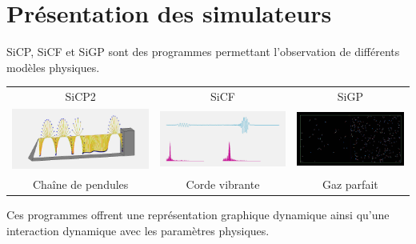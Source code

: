 %
\section{Présentation des simulateurs}
%
SiCP, SiCF et SiGP sont des programmes permettant l'observation de différents modèles physiques.
\begin{center}
\renewcommand{\arraystretch}{1.1}
\begin{tabular}{ccc}%
SiCP2  & SiCF & SiGP \\
\includegraphics[scale=0.157]{./illustration/SiCP2} & \includegraphics[scale=0.157]{./illustration/SiCF} & \includegraphics[scale=0.157]{./illustration/SiGP} \\
Chaîne de pendules  & Corde vibrante & Gaz parfait \\
\end{tabular}
\end{center}
%
Ces programmes offrent une représentation graphique dynamique ainsi qu'une interaction dynamique avec les paramètres physiques.
%
